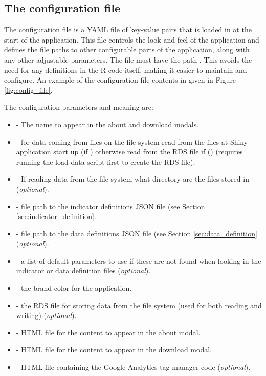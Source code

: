 \documentclass[12pt]{article}
\begin{document}
\newpage
\clearpage
\subsection{The configuration file}\label{sec:config_file}

The configuration file is a YAML file of key-value pairs that is loaded in at the start of the application.  This file controls the look and feel of the application and defines the file paths to other configurable parts of the application, along with any other adjustable parameters.  The file must have the path .  This avoids the need for any definitions in the R code itself, making it easier to maintain and configure.  An example of the configuration file contents in given in Figure \ref{fig:config_file}.

The configuration parameters and meaning are:
\begin{itemize}
\item {} - The name to appear in the about and download modals.
\item {} - for data coming from files on the file system read from the files at Shiny application start up (if ) otherwise read from the RDS file if () (requires running the load data script first to create the RDS file).
\item {} - If reading data from the file system what directory are the files stored in (\textit{optional}).
\item {} - file path to the indicator definitions JSON file (see Section \ref{sec:indicator_definition}.
\item {} - file path to the data definitions JSON file (see Section \ref{sec:data_definition} (\textit{optional}).
\item {} - a list of default parameters to use if these are not found when looking in the indicator or data definition files (\textit{optional}).
\item {} - the brand color for the application.
\item {} - the RDS file for storing data from the file system (used for both reading and writing) (\textit{optional}).
\item {} - HTML file for the content to appear in the about modal.
\item {} - HTML file for the content to appear in the download modal.
\item {} - HTML file containing the Google Analytics tag manager code (\textit{optional}).
\end{itemize}
\end{document}
